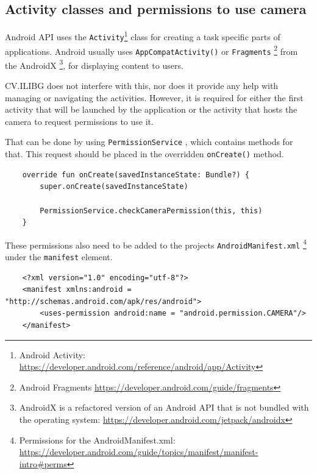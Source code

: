 \subsection{Activity classes and permissions to use camera}
Android API uses the \texttt{Activity}\footnote{Android Activity: \url{https://developer.android.com/reference/android/app/Activity}} class for creating a task specific parts of applications. Android usually uses \texttt{AppCompatActivity()} or \texttt{Fragments} \footnote{Android Fragments \url{https://developer.android.com/guide/fragments}} from the AndroidX \footnote{AndroidX is a refactored version of an Android API that is not bundled with the operating system: \url{https://developer.android.com/jetpack/androidx}}, for displaying content to users. 

CV.ILIBG does not interfere with this, nor does it provide any help with managing or navigating the activities. However, it is required for either the first activity that will be launched by the application or the activity that hosts the camera to request permissions to use it. 

That can be done by using \texttt{PermissionService} , which contains methods for that. This request should be placed in the overridden \texttt{onCreate()} method.

\begin{lstlisting}
    override fun onCreate(savedInstanceState: Bundle?) {
        super.onCreate(savedInstanceState)

        PermissionService.checkCameraPermission(this, this)
    }
\end{lstlisting}

These permissions also need to be added to the projects \texttt{AndroidManifest.xml} \footnote{Permissions for the AndroidManifest.xml: \url{https://developer.android.com/guide/topics/manifest/manifest-intro\#perms}} under the \texttt{manifest} element.

\begin{lstlisting}
    <?xml version="1.0" encoding="utf-8"?>
    <manifest xmlns:android = "http://schemas.android.com/apk/res/android">
        <uses-permission android:name = "android.permission.CAMERA"/>
    </manifest>
\end{lstlisting}



